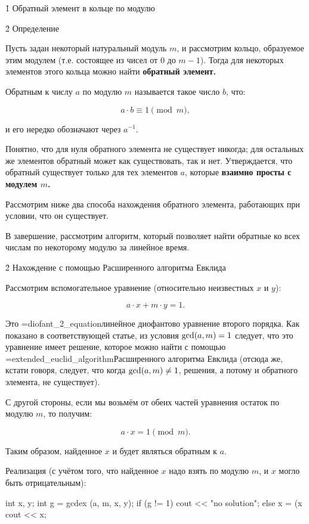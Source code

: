 \h1{ Обратный элемент в кольце по модулю }


\h2{ Определение }

Пусть задан некоторый натуральный модуль $m$, и рассмотрим кольцо, образуемое этим модулем (т.е. состоящее из чисел от $0$ до $m-1$). Тогда для некоторых элементов этого кольца можно найти \bf{обратный элемент}.

Обратным к числу $a$ по модулю $m$ называется такое число $b$, что:

$$ a \cdot b \equiv 1 \pmod m, $$

и его нередко обозначают через $a^{-1}$.

Понятно, что для нуля обратного элемента не существует никогда; для остальных же элементов обратный может как существовать, так и нет. Утверждается, что обратный существует только для тех элементов $a$, которые \bf{взаимно просты} с модулем $m$.

Рассмотрим ниже два способа нахождения обратного элемента, работающих при условии, что он существует.

В завершение, рассмотрим алгоритм, который позволяет найти обратные ко всех числам по некоторому модулю за линейное время.


\h2{ Нахождение с помощью Расширенного алгоритма Евклида }

Рассмотрим вспомогательное уравнение (относительно неизвестных $x$ и $y$):

$$ a \cdot x + m \cdot y = 1. $$

Это \algohref=diofant_2_equation{линейное диофантово уравнение второго порядка}. Как показано в соответствующей статье, из условия ${\rm gcd}(a,m)=1$ следует, что это уравнение имеет решение, которое можно найти с помощью \algohref=extended_euclid_algorithm{Расширенного алгоритма Евклида} (отсюда же, кстати говоря, следует, что когда ${\rm gcd}(a,m) \ne 1$, решения, а потому и обратного элемента, не существует).

С другой стороны, если мы возьмём от обеих частей уравнения остаток по модулю $m$, то получим:

$$ a \cdot x = 1 \pmod m. $$

Таким образом, найденное $x$ и будет являться обратным к $a$.

Реализация (с учётом того, что найденное $x$ надо взять по модулю $m$, и $x$ могло быть отрицательным):

\code
int x, y;
int g = gcdex (a, m, x, y);
if (g != 1)
	cout << "no solution";
else {
	x = (x %
	cout << x;
}
\endcode


